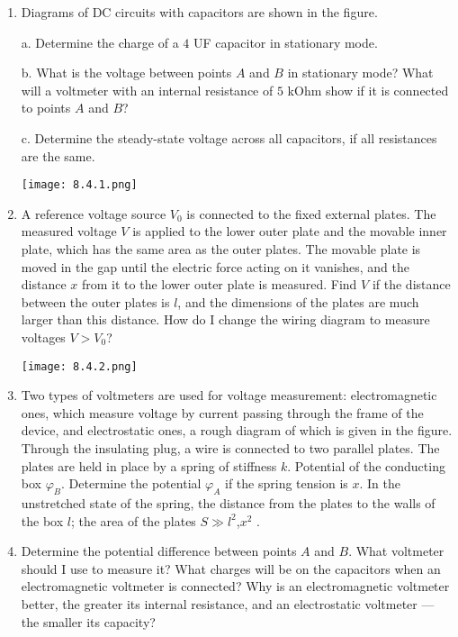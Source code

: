 \documentclass{article}
\begin{document}
\begin{enumerate}[label=8.4.\arabic*]

\item Diagrams of DC circuits with capacitors are shown in the figure. 

a. Determine the charge of a $4$ UF capacitor in stationary mode. 

b. What is the voltage between points $A$ and $B$ in stationary mode? What will a voltmeter with an internal resistance of $5$ kOhm show if it is connected to points $A$ and $B$?

c. Determine the steady-state voltage across all capacitors, if all resistances are the same.

\begin{center}
    \texttt{[image: 8.4.1.png]}
\end{center}

\item A reference voltage source $V_0$ is connected to the fixed external plates. The measured voltage $V$ is applied to the lower outer plate and the movable inner plate, which has the same area as the outer plates. The movable plate is moved in the gap until the electric force acting on it vanishes, and the distance $x$ from it to the lower outer plate is measured. Find $V$ if the distance between the outer plates is $l$, and the dimensions of the plates are much larger than this distance. How do I change the wiring diagram to measure voltages $V > V_0$?

\begin{center}
    \texttt{[image: 8.4.2.png]}
\end{center}

\item Two types of voltmeters are used for voltage measurement: electromagnetic ones, which measure voltage by current passing through the frame of the device, and electrostatic ones, a rough diagram of which is given in the figure. Through the insulating plug, a wire is connected to two parallel plates. The plates are held in place by a spring of stiffness $k$. Potential of the conducting box $\varphi_B$. Determine the potential $\varphi_A$ if the spring tension is $x$. In the unstretched state of the spring, the distance from the plates to the walls of the box $l$; the area of the plates $S \gg l^2$,$x^2$ .

\item Determine the potential difference between points $A$ and $B$. What voltmeter should I use to measure it? What charges will be on the capacitors when an electromagnetic voltmeter is connected? Why is an electromagnetic voltmeter better, the greater its internal resistance, and an electrostatic voltmeter — the smaller its capacity?


\end{enumerate}
\end{document}
